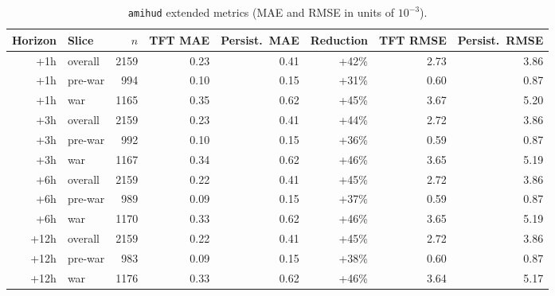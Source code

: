 \begin{table}[h]
  \centering
  \small
  \caption{\texttt{amihud} extended metrics (MAE and RMSE in units of $10^{-3}$).}
  \label{tab:metrics-amihud}
  \begin{tabular}{@{}rlrrrrrr@{}}
    \toprule
    Horizon & Slice & $n$ & TFT MAE & Persist.\ MAE & Reduction & TFT RMSE & Persist.\ RMSE \\
    \midrule
    +1h & overall & 2159 & 0.23 & 0.41 & +42\% & 2.73 & 3.86 \\
    +1h & pre-war & 994 & 0.10 & 0.15 & +31\% & 0.60 & 0.87 \\
    +1h & war & 1165 & 0.35 & 0.62 & +45\% & 3.67 & 5.20 \\
    +3h & overall & 2159 & 0.23 & 0.41 & +44\% & 2.72 & 3.86 \\
    +3h & pre-war & 992 & 0.10 & 0.15 & +36\% & 0.59 & 0.87 \\
    +3h & war & 1167 & 0.34 & 0.62 & +46\% & 3.65 & 5.19 \\
    +6h & overall & 2159 & 0.22 & 0.41 & +45\% & 2.72 & 3.86 \\
    +6h & pre-war & 989 & 0.09 & 0.15 & +37\% & 0.59 & 0.87 \\
    +6h & war & 1170 & 0.33 & 0.62 & +46\% & 3.65 & 5.19 \\
    +12h & overall & 2159 & 0.22 & 0.41 & +45\% & 2.72 & 3.86 \\
    +12h & pre-war & 983 & 0.09 & 0.15 & +38\% & 0.60 & 0.87 \\
    +12h & war & 1176 & 0.33 & 0.62 & +46\% & 3.64 & 5.17 \\
    \bottomrule
  \end{tabular}
\end{table}

